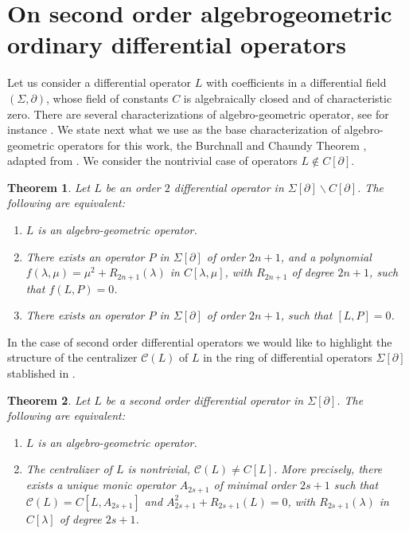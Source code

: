 \documentclass[a4paper,12pt]{article}
\newcommand{\cC}{\mathcal{C}}
\newtheorem{thm}{Theorem}[section]
\begin{document}
\section{ On second order algebrogeometric  ordinary differential operators}\label{sec-algebro-L2}


\bigskip

Let us consider a differential operator $L$ with coefficients in a differential field $(\Sigma,\partial)$, whose field of constants $C$ is algebraically closed and of characteristic zero. There are several characterizations of algebro-geometric operator, see for instance \cite{We}. We  state next what we use as the base characterization of algebro-geometric operators for this work, the Burchnall and Chaundy Theorem \cite{BC}, {adapted from \cite{We}}.
We consider the nontrivial case of operators $L\not\in C[\partial]$.

\begin{thm}\label{thm-algegeom}
Let $L$ be an order $2$ differential operator in $\Sigma[\partial]\backslash C[\partial]$. The following are equivalent:
\begin{enumerate}
    \item $L$ is an algebro-geometric operator.
    \item There exists an operator $P$ in $\Sigma[\partial]$ of order $2n+1$, and a polynomial $f(\lambda,\mu)=\mu^2+R_{2n+1}(\lambda)$ in $C[\lambda,\mu]$, with $R_{2n+1}$ of degree $2n+1$, such that $f(L,P)=0$.
    \item There exists an operator $P$ in $\Sigma[\partial]$ of order $2n+1$, such that $[L,P]=0$.
\end{enumerate}
\end{thm}

In the case of second order differential operators we would like to highlight the structure of the centralizer $\cC(L)$ of $L$ in the ring of differential operators $\Sigma[\partial]$ stablished in \cite{MRZ2}. 

\begin{thm}\label{thm-agCen}
Let $L$ be a second order  differential operator in $\Sigma[\partial]$. The following are equivalent:
\begin{enumerate}
    \item $L$ is an algebro-geometric operator.
    \item The centralizer of $L$ is nontrivial, $\cC(L)\neq C[L]$. More precisely, there exists {a unique monic operator $A_{2s+1}$ of minimal order $2s+1$ such that $\cC(L)=C[L,A_{2s+1}]$ and $A^2_{2s+1}+R_{2s+1}(L)=0$, with $R_{2s+1}(\lambda)$ in $C[\lambda]$ of degree $2s+1$.}
\end{enumerate}
\end{thm}
\end{document}
